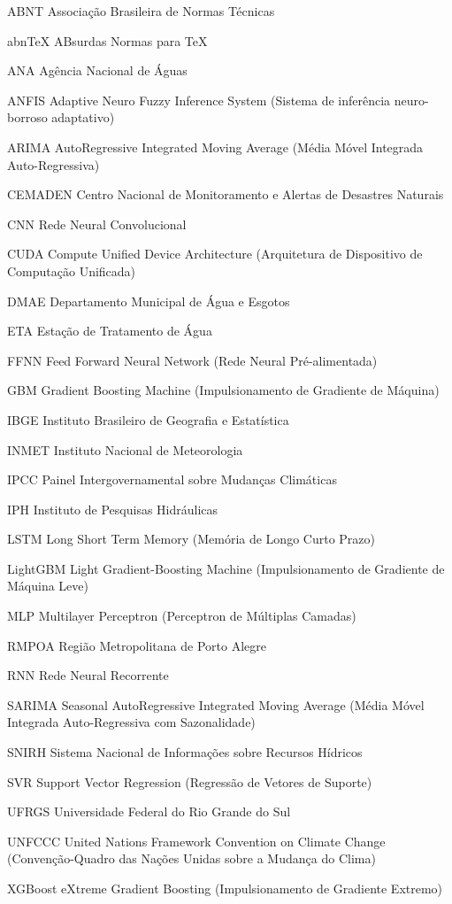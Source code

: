 \documentclass[
	12pt,				%
	openright,			%
	twoside,			%
	a4paper,			%
	english,			%
	french,				%
	spanish,			%
  japanese,
	brazil				%
	]{abntex2}
\begin{document}
\begin{siglas}
  \item[ABNT] Associação Brasileira de Normas Técnicas
  \item[abnTeX] ABsurdas Normas para TeX
  \item[ANA] Agência Nacional de Águas
  \item[ANFIS] Adaptive Neuro Fuzzy Inference System (Sistema de inferência neuro-borroso adaptativo) 
  \item[ARIMA] AutoRegressive Integrated Moving Average (Média Móvel Integrada Auto-Regressiva)
  \item[CEMADEN] Centro Nacional de Monitoramento e Alertas de Desastres Naturais 
  \item[CNN] Rede Neural Convolucional
  \item[CUDA] Compute Unified Device Architecture (Arquitetura de Dispositivo de Computação Unificada)
  \item[DMAE] Departamento Municipal de Água e Esgotos
  \item[ETA] Estação de Tratamento de Água 
  \item[FFNN] Feed Forward Neural Network (Rede Neural Pré-alimentada)
  \item[GBM] Gradient Boosting Machine (Impulsionamento de Gradiente de Máquina) 
  \item[IBGE] Instituto Brasileiro de Geografia e Estatística
  \item[INMET] Instituto Nacional de Meteorologia
  \item[IPCC] Painel Intergovernamental sobre Mudanças Climáticas
  \item[IPH] Instituto de Pesquisas Hidráulicas
  \item[LSTM] Long Short Term Memory (Memória de Longo Curto Prazo)
  \item[LightGBM] Light Gradient-Boosting Machine (Impulsionamento de Gradiente de Máquina Leve) 
  \item[MLP] Multilayer Perceptron (Perceptron de Múltiplas Camadas)
  \item[RMPOA] Região Metropolitana de Porto Alegre 
  \item[RNN] Rede Neural Recorrente
  \item[SARIMA] Seasonal AutoRegressive Integrated Moving Average (Média Móvel Integrada Auto-Regressiva com Sazonalidade)
  \item[SNIRH] Sistema Nacional de Informações sobre Recursos Hídricos
  \item[SVR] Support Vector Regression (Regressão de Vetores de Suporte)
  \item[UFRGS] Universidade Federal do Rio Grande do Sul
  \item[UNFCCC] United Nations Framework Convention on Climate Change (Convenção-Quadro das Nações Unidas sobre a Mudança do Clima)
  \item[XGBoost] eXtreme Gradient Boosting (Impulsionamento de Gradiente Extremo)

\end{siglas}
\end{document}
